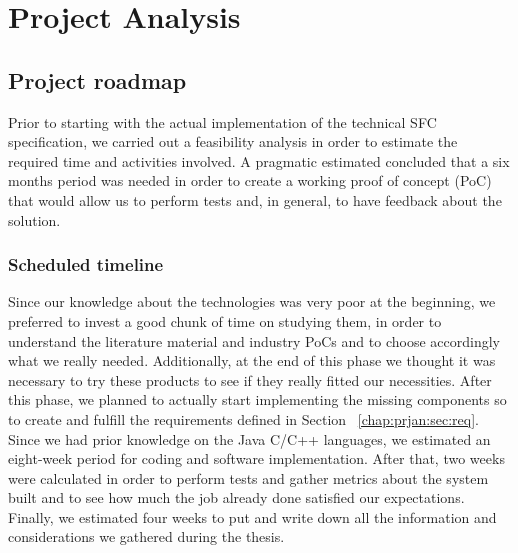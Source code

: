 \chapter{Project Analysis}
\label{chap:prjan}

\section{Project roadmap}
\label{chap:prjan:sec:prjsche}

Prior to starting with the actual implementation of the technical SFC
specification, we carried out a feasibility analysis in order to estimate the
required time and activities involved. A pragmatic estimated concluded that a
six months period was needed in order to create a working proof of concept
(PoC) that would allow us to perform tests and, in general, to have feedback
about the solution.

\subsection{Scheduled timeline}
Since our knowledge about the technologies was very poor at the beginning, we
preferred to invest a good chunk of time on studying them, in order to
understand the literature material and industry PoCs and to choose accordingly
what we really needed. Additionally, at the end of this phase we thought it was
necessary to try these products to see if they really fitted our necessities.
After this phase, we planned to actually start implementing the missing
components so to create and fulfill the requirements defined in Section~
\ref{chap:prjan:sec:req}. Since we had prior knowledge on the Java C/C++
languages, we estimated an eight-week period for coding and software
implementation. After that, two weeks were calculated in order to perform tests
and gather metrics about the system built and to see how much the job already
done satisfied our expectations. Finally, we estimated four weeks to put and
write down all the information and considerations we gathered during the thesis.

